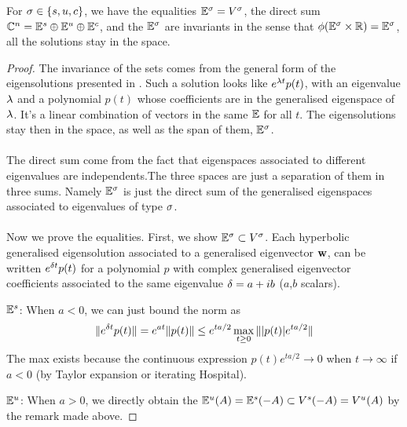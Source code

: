 \begin{lemme}
    For $\sigma\in\{s,u,c\}$, we have the equalities $\mathbb{E}^\sigma=V^\sigma$, the direct sum $\mathbb{C}^n = \mathbb{E}^s\oplus\mathbb{E}^u\oplus\mathbb{E}^c$, and the $\mathbb{E}^\sigma$ are invariants in the sense that $\phi(\mathbb{E}^\sigma\times\mathbb{R})=\mathbb{E}^\sigma$, \ie all the solutions stay in the space.
\end{lemme}
\begin{proof}
The invariance of the sets comes from the general form of the eigensolutions presented in . Such a solution looks like $e^{\lambda t}p(t)$, with an eigenvalue $\lambda$ and a polynomial $p(t)$ whose coefficients are in the generalised eigenspace of $\lambda$. It's a linear combination of vectors in the same $\mathbb{E}$ for all $t$. The eigensolutions stay then in the space, as well as the span of them, $\mathbb{E}^\sigma$.
\\ \\
The direct sum come from the fact that eigenspaces associated to different eigenvalues are independents.The three spaces are just a separation of them in three sums. Namely $\mathbb{E}^\sigma$ is just the direct sum of the generalised eigenspaces associated to eigenvalues of type $\sigma$.
\\ \\
Now we prove the equalities. First, we show $\mathbb{E}^\sigma\subset V^\sigma$. Each hyperbolic generalised eigensolution associated to a generalised eigenvector $\mathbf{w}$, can be written $e^{\delta t}p(t)$ for a  polynomial $p$ with complex generalised eigenvector coefficients associated to the same eigenvalue $\delta=a+ib$ ($a$,$b$ scalars).

$\mathbb{E}^s$: When $a<0$, we can just bound the norm as 
$$\|e^{\delta t}p(t)\|=e^{at}\|p(t)\| \leq e^{ta/2} \max_{t\geq0}\||p(t)|e^{ta/2}\| $$
The max exists because the continuous expression $p(t)e^{ta/2}\to 0$ when $t\to\infty$ if $a<0$ (by Taylor expansion or iterating Hospital).

$\mathbb{E}^u$: When $a>0$, we directly obtain the $\mathbb{E}^u(A) = \mathbb{E}^s(-A) \subset V^s(-A) = V^u(A)$ by the remark made above.


\end{proof}
